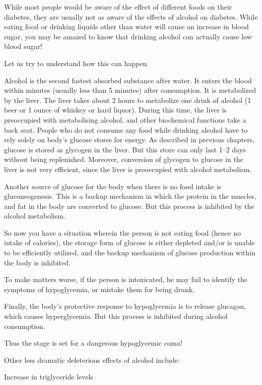 While most people would be aware of the effect of different foods on their diabetes, they are usually not as aware of the effects of alcohol on diabetes. While eating food or drinking liquids other than water will cause an increase in blood sugar, you may be amazed to know that drinking alcohol can actually cause low blood sugar!

Let us try to understand how this can happen.

Alcohol is the second fastest absorbed substance after water. It enters the blood within minutes (usually less than 5 minutes) after consumption. It is metabolized by the liver. The liver takes about 2 hours to metabolize one drink of alcohol (1 beer or 1 ounce of whiskey or hard liquor). During this time, the liver is preoccupied with metabolising alcohol, and other biochemical functions take a back seat. People who do not consume any food while drinking alcohol have to rely solely on body’s glucose stores for energy. As described in previous chapters, glucose is stored as glycogen in the liver. But this store can only last 1–2 days without being replenished. Moreover, conversion of glycogen to glucose in the liver is not very efficient, since the liver is preoccupied with alcohol metabolism.

Another source of glucose for the body when there is no food intake is gluconeogenesis. This is a backup mechanism in which the protein in the muscles, and fat in the body are converted to glucose. But this process is inhibited by the alcohol metabolism.

So now you have a situation wherein the person is not eating food (hence no intake of calories), the storage form of glucose is either depleted and/or is unable to be efficiently utilized, and the backup mechanism of glucose production within the body is inhibited.

To make matters worse, if the person is intoxicated, he may fail to identify the symptoms of hypoglycemia, or mistake them for being drunk.

Finally, the body’s protective response to hypoglycemia is to release glucagon, which causes hyperglycemia. But this process is inhibited during alcohol consumption.

Thus the stage is set for a dangerous hypoglycemic coma!

Other less dramatic deleterious effects of alcohol include:

\item Increase in triglyceride levels


